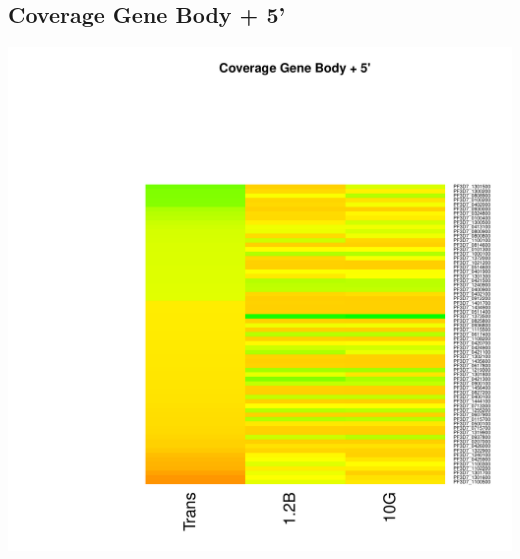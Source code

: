 \documentclass{article}\usepackage[]{graphicx}\usepackage[]{color}
\newenvironment{knitrout}{}{} %
\begin{document}
\subsection{Coverage Gene Body + 5'}
\begin{knitrout}
\color{fgcolor}

{\centering \includegraphics[width=.9\linewidth]{figure/minimal-heat_cov_tss_gene-1} 

}



\end{knitrout}
\clearpage

\end{document}
